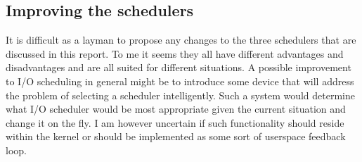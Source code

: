\documentclass[10pt, titlepage, oneside, a4paper]{article}
\begin{document}
            \subsection{Improving the schedulers}
            
            It is difficult as a layman to propose any changes to the three schedulers that are discussed in this report. To me it seems they all have different advantages and disadvantages and are all suited for different situations. A possible improvement to I/O scheduling in general might be to introduce some device that will address the problem of selecting a scheduler intelligently. Such a system would determine what I/O scheduler would be most appropriate given the current situation and change it on the fly. I am however uncertain if such functionality should reside within the kernel or should be implemented as some sort of userspace feedback loop.
        
        \pagebreak
        
\end{document}
